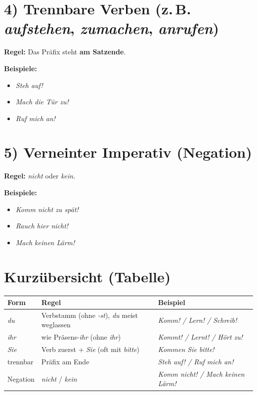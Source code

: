 \documentclass[varwidth,border=10pt]{standalone}
\begin{document}
    \vspace{6pt}
    
    
    \section*{4) Trennbare Verben (z.\,B. \textit{aufstehen}, \textit{zumachen}, \textit{anrufen})}
    \textbf{Regel:} Das Präfix steht \textbf{am Satzende}.\par
    \textbf{Beispiele:}
    \begin{itemize}
        \item \textit{Steh auf!}
        \item \textit{Mach die Tür zu!}
        \item \textit{Ruf mich an!}
    \end{itemize}
    
    \vspace{6pt}
    
    
    \section*{5) Verneinter Imperativ (Negation)}
    \textbf{Regel:} \textit{nicht} oder \textit{kein}.\par
    \textbf{Beispiele:}
    \begin{itemize}
        \item \textit{Komm nicht zu spät!}
        \item \textit{Rauch hier nicht!}
        \item \textit{Mach keinen Lärm!}
    \end{itemize}
    
    \vspace{10pt}
    
    
    \section*{Kurzübersicht (Tabelle)}
    \renewcommand{\arraystretch}{1.25}
    \begin{tabularx}{\linewidth}{|>{\raggedright\arraybackslash}p{2.6cm}|X|X|}
\hline
\textbf{Form} & \textbf{Regel} & \textbf{Beispiel} \\
\hline
\textit{du} & Verbstamm (ohne \textit{-st}), \textit{du} meist weglassen
& \textit{Komm! / Lern! / Schreib!} \\
\hline
\textit{ihr} & wie Präsens-\textit{ihr} (ohne \textit{ihr})
& \textit{Kommt! / Lernt! / Hört zu!} \\
\hline
\textit{Sie} & Verb zuerst + \textit{Sie} (oft mit \textit{bitte})
& \textit{Kommen Sie bitte!} \\
\hline
trennbar & Präfix am Ende
& \textit{Steh auf! / Ruf mich an!} \\
\hline
Negation & \textit{nicht} / \textit{kein}
& \textit{Komm nicht! / Mach keinen Lärm!} \\
\hline
    \end{tabularx}
\end{document}
